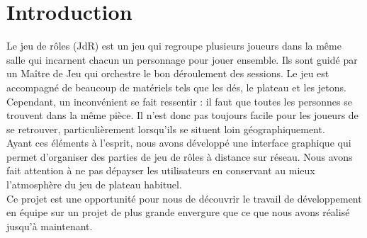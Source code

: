 \section{Introduction}

Le jeu de rôles (JdR) est un jeu qui regroupe plusieurs joueurs dans la même salle qui incarnent chacun un personnage pour jouer ensemble. Ils sont guidé par un Maître de Jeu qui orchestre le bon déroulement des sessions. Le jeu est accompagné de beaucoup de matériels tels que les dés, le plateau et les jetons. Cependant, un inconvénient se fait ressentir : il faut que toutes les personnes se trouvent dans la même pièce. Il n'est donc pas toujours facile pour les joueurs de se retrouver, particulièrement lorsqu'ils se situent loin géographiquement. \\

Ayant ces éléments à l'esprit, nous avons développé une interface graphique qui permet d'organiser des parties de jeu de rôles à distance sur réseau. Nous avons fait attention à ne pas dépayser les utilisateurs en conservant au mieux l'atmosphère du jeu de plateau habituel. \\

Ce projet est une opportunité pour nous de découvrir le travail de développement en équipe sur un projet de plus grande envergure que ce que nous avons réalisé jusqu'à maintenant.	